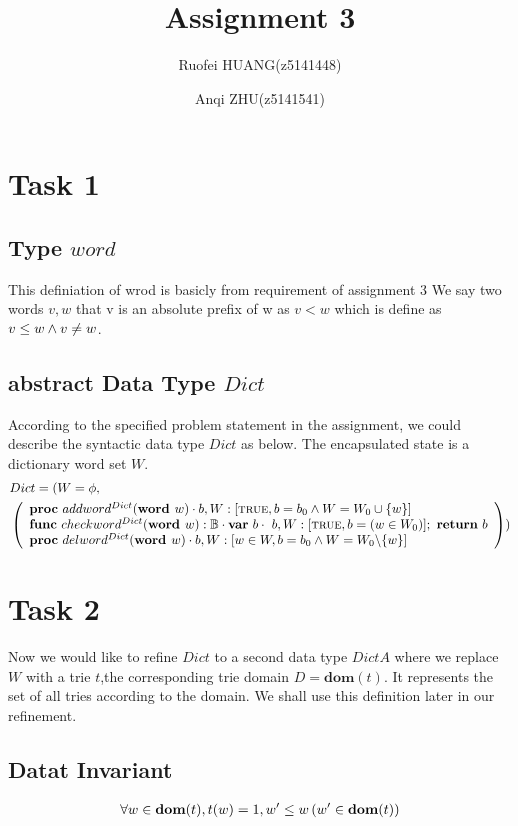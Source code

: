 \documentclass[a4paper,12pt,fleqn]{scrartcl}
\title{Assignment 3}
\author{Ruofei HUANG(z5141448)\and
Anqi ZHU(z5141541)
}
\newcommand{\domt}{\textbf{dom}(t)}
\newcommand{\WORD}{\textbf{word }}
\begin{document}
\maketitle
\section{Task 1}
\subsection{Type $word$ }
This definiation of wrod is basicly from requirement of assignment 3
We say two words $ v,w$ that v is an absolute prefix of w as $v < w$ which is 
define as $ v \leq w \wedge v \neq w $.
\subsection{abstract Data Type $Dict$ }
According to the specified problem statement in the assignment, 
we could describe the syntactic data type $Dict$ as below.
The encapsulated state is a dictionary word set $W$.
\begin{align*}
    &Dict = 
    (
        W = \phi,  \\
        &\left( 
            \begin{array}{l}
                \PROC\ addword^{Dict}(\WORD w)\cdot 
                b, W:[\True, b = b_0\And W = W_0\cup \{w\}]\\
                \FUNC\ checkword^{Dict}(\WORD w):\mathbb{B}\cdot
                    \VAR\ b\cdot\ b, W:[\True, b = (w\in W_0)];\ 
                    \RETURN\ b\\
                \PROC\ delword^{Dict}(\WORD w)\cdot
                b, W:[ w\in W, b = b_0\And W = W_0 \backslash \{w\}]
            \end{array}
        \right)
    )
\end{align*}
\section{Task 2}
Now we would like to refine $Dict$ to a second data type $DictA$ where we 
replace $W$ with a trie $t$,the corresponding trie domain $D=\domt$.
It represents the set of all tries according to the domain. 
We shall use this definition later in our refinement.\\

\subsection{Datat Invariant} 
\begin{gather*}
    \All{w \in \domt,t(w)= 1, w' \leq w}{w' \in \domt}
\end{gather*}
\end{document}
